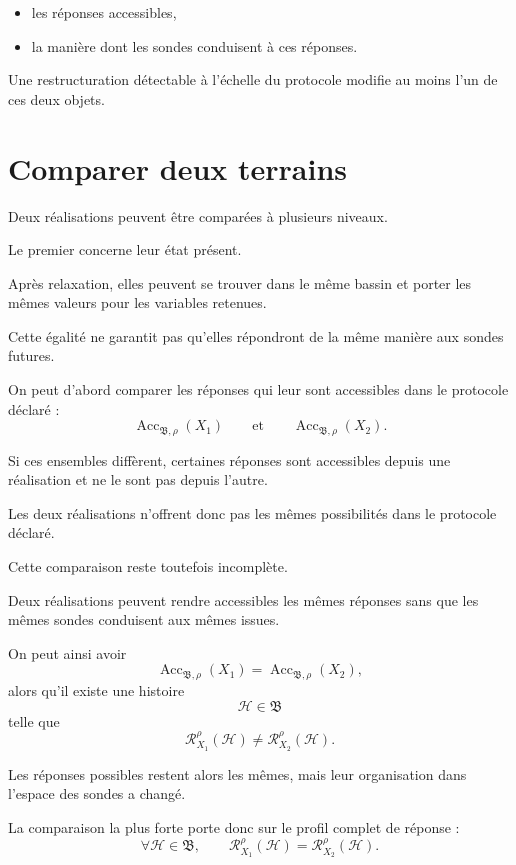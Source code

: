\begin{itemize}
\item les réponses accessibles,
\item la manière dont les sondes conduisent à ces réponses.
\end{itemize}

Une restructuration détectable à l'échelle du protocole modifie au moins l'un de ces deux objets.

\section{Comparer deux terrains}
\label{t3-comparer-deux-terrains}

Deux réalisations peuvent être comparées à plusieurs niveaux.

Le premier concerne leur état présent.

Après relaxation, elles peuvent se trouver dans le même bassin et porter les mêmes valeurs pour les variables retenues.

Cette égalité ne garantit pas qu'elles répondront de la même manière aux sondes futures.

On peut d'abord comparer les réponses qui leur sont accessibles dans le protocole déclaré :
\[
\operatorname{Acc}_{\mathfrak B,\rho}(X_1)
\qquad\text{et}\qquad
\operatorname{Acc}_{\mathfrak B,\rho}(X_2).
\]

Si ces ensembles diffèrent, certaines réponses sont accessibles depuis une réalisation et ne le sont pas depuis l'autre.

Les deux réalisations n'offrent donc pas les mêmes possibilités dans le protocole déclaré.

Cette comparaison reste toutefois incomplète.

Deux réalisations peuvent rendre accessibles les mêmes réponses sans que les mêmes sondes conduisent aux mêmes issues.

On peut ainsi avoir
\[
\operatorname{Acc}_{\mathfrak B,\rho}(X_1)
=
\operatorname{Acc}_{\mathfrak B,\rho}(X_2),
\]
alors qu'il existe une histoire
\[
\mathcal H\in\mathfrak B
\]
telle que
\[
\mathcal R_{X_1}^{\rho}(\mathcal H)
\neq
\mathcal R_{X_2}^{\rho}(\mathcal H).
\]

Les réponses possibles restent alors les mêmes, mais leur organisation dans l'espace des sondes a changé.

La comparaison la plus forte porte donc sur le profil complet de
réponse :
\[
\forall \mathcal H\in\mathfrak B,
\qquad
\mathcal R_{X_1}^{\rho}(\mathcal H)
=
\mathcal R_{X_2}^{\rho}(\mathcal H).
\]

